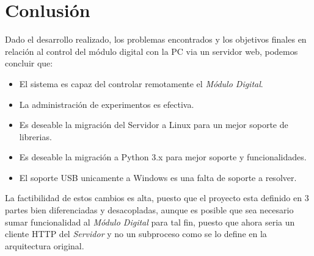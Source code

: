 \section{Conlusi\'on}

Dado el desarrollo realizado, los problemas encontrados y los objetivos finales en relaci\'on
al control del m\'odulo digital con la PC via un servidor web, podemos concluir que:

\begin{itemize}
    \item El sistema es capaz del controlar remotamente el \textit{M\'odulo Digital}.
    \item La administraci\'on de experimentos es efectiva.
    \item Es deseable la migraci\'on del Servidor a Linux para un mejor soporte de librerias.
    \item Es deseable la migraci\'on a Python 3.x para mejor soporte y funcionalidades.
    \item El soporte USB unicamente a Windows es una falta de soporte a resolver.
\end{itemize}

La factibilidad de estos cambios es alta, puesto que el proyecto esta definido en 3 partes
bien diferenciadas y desacopladas, aunque es posible que sea necesario sumar funcionalidad 
al \textit{M\'odulo Digital} para tal fin, puesto que ahora seria un cliente HTTP del \textit{Servidor} y
no un subproceso como se lo define en la arquitectura original.

\newpage